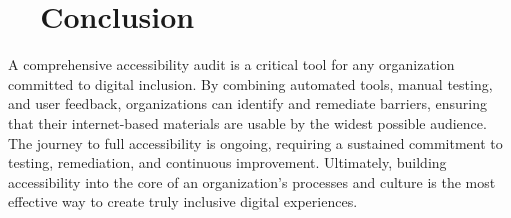 \section{~~Conclusion}
\label{sec:conclusion-auditing}
A comprehensive accessibility audit is a critical tool for any organization committed to digital inclusion. By combining automated tools, manual testing, and user feedback, organizations can identify and remediate  barriers, ensuring that their internet-based materials are usable by the widest possible audience. The journey to full accessibility is ongoing, requiring a sustained commitment to testing, remediation, and continuous improvement. Ultimately, building accessibility into the core of an organization's processes and culture is the most effective way to create truly inclusive digital experiences.
\supercite{Thatcher2006}

